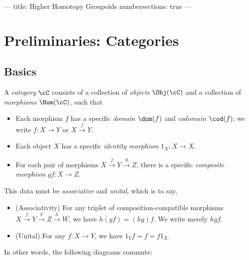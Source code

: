 ---
title: Higher Homotopy Groupoids
numbersections: true
---

\section{Preliminaries: Categories}

\subsection{Basics}

\begin{dfn}[Category]
	A \emph{category} $\cC$ consists of a collection of \emph{objects} $\Obj(\cC)$
	and a collection of \emph{morphisms} $\Hom(\cC)$, such that

	\begin{itemize}
		\item Each morphism $f$ has a specific \emph{domain} $\dom(f)$ and
		      \emph{codomain} $\cod(f)$; we write $f: X\rightarrow Y$ or
		      $X\xrightarrow{f} Y$.
		\item Each object $X$ has a specific \emph{identity morphism} $1_X:
			      X\rightarrow X$.
		\item For each pair of morphisms $X\xrightarrow{f} Y\xrightarrow{g}
			      Z$, there is a specific \emph{composite morphism} $gf:
			      X\rightarrow Z$.
	\end{itemize}
	This data must be \emph{associative} and \emph{unital}, which is to say,
	\begin{itemize}
		\item (Associativity) For any triplet of composition-compatible morphisms
		      $X\xrightarrow{f}Y \xrightarrow{g}Z\xrightarrow{h}W$, we have $h(gf) =
			      (hg)f$. We write merely $hgf$.
		\item (Unital) For any $f: X\rightarrow Y$, we have $1_Yf = f = f1_X$.
	\end{itemize}

	In other words, the following diagrams commute:

	\begin{figure}[H]
		\centering
		\begin{multicols}{2}


\end{multicols}
\end{figure}
\end{dfn}
